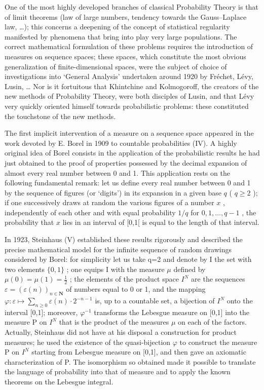 
One of the most highly developed branches of classical Probability Theory is that of limit theorems (law of large numbers, tendency towards the Gauss--Laplace law, \ldots); this concerns a deepening of the concept of statistical regularity manifested by phenomena that bring into play very large populations. The correct mathematical formulation of these problems requires the introduction of measures on sequence spaces; these spaces, which constitute the most obvious generalization of finite-dimensional spaces, were the subject of choice of investigations into `General Analysis' undertaken around 1920 by Fréchet, Lévy, Lusin, \ldots{} Nor is it fortuitous that Khintchine and Kolmogoroff, the creators of the new methods of Probability Theory, were both disciples of Lusin, and that Lévy very quickly oriented himself towards probabilistic problems: these constituted the touchstone of the new methods.

The first implicit intervention of a measure on a sequence space appeared in the work devoted by E. Borel in 1909 to countable probabilities (IV). A highly original idea of Borel consists in the application of the probabilistic results he had just obtained to the proof of properties possessed by the decimal expansion of almost every real number between 0 and 1. This application rests on the following fundamental remark: let us define every real number between 0 and 1 by the sequence of figures (or `digits') in its expansion in a given base \(q\) ( \(q \geqslant 2\) ); if one successively draws at random the various figures of a number \(x\) , independently of each other and with equal probability \(1 / q\) for \(0,1,\ldots ,q - 1\) , the probability that \(x\) lies in an interval of {[}0,1{[} is equal to the length of that interval.

In 1923, Steinhaus (V) established these results rigorously and described the precise mathematical model for the infinite sequence of random drawings considered by Borel: for simplicity let us take q=2 and denote by I the set with two elements \(\{0,1\}\) ; one equips I with the measure \(\mu\) defined by \(\mu(0)=\mu(1)=\frac{1}{2}\) ; the elements of the product space \(I^{N}\) are the sequences \(\varepsilon=(\varepsilon(n))_{n\in\mathbf{N}}\) of numbers equal to 0 or 1, and the mapping \(\varphi:\varepsilon\mapsto\sum_{n\geqslant0}\varepsilon(n)\cdot2^{-n-1}\) is, up to a countable set, a bijection of \(I^{N}\) onto the interval {[}0,1{]}; moreover, \(\varphi^{-1}\) transforms the Lebesgue measure on {[}0,1{]} into the measure P on \(I^{N}\) that is the product of the measures \(\mu\) on each of the factors. Actually, Steinhaus did not have at his disposal a construction for product measures; he used the existence of the quasi-bijection \(\varphi\) to construct the measure P on \(I^{N}\) starting from Lebesgue measure on {[}0,1{]}, and then gave an axiomatic characterization of P. The isomorphism so obtained made it possible to translate the language of probability into that of measure and to apply the known theorems on the Lebesgue integral.

